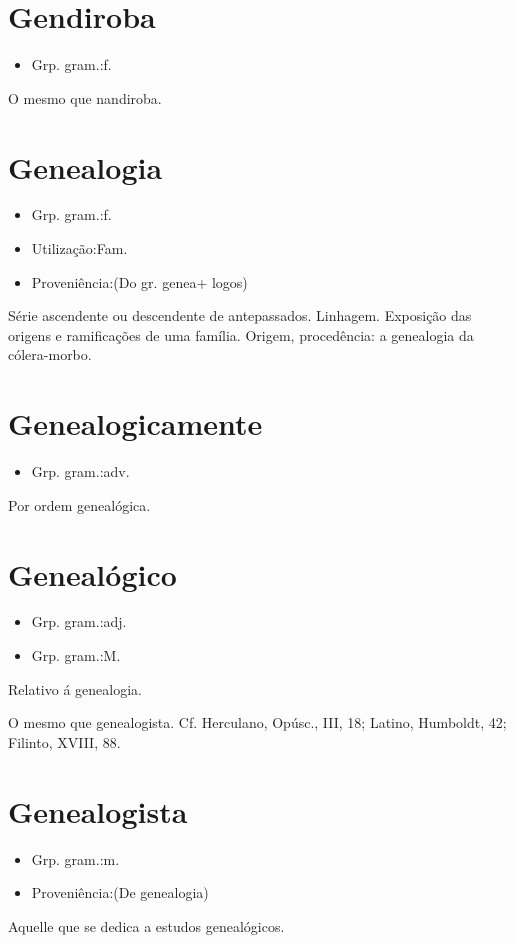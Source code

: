 \section{Gendiroba}
\begin{itemize}
\item {Grp. gram.:f.}
\end{itemize}
O mesmo que \textunderscore nandiroba\textunderscore .
\section{Genealogia}
\begin{itemize}
\item {Grp. gram.:f.}
\end{itemize}
\begin{itemize}
\item {Utilização:Fam.}
\end{itemize}
\begin{itemize}
\item {Proveniência:(Do gr. \textunderscore genea\textunderscore  + \textunderscore logos\textunderscore )}
\end{itemize}
Série ascendente ou descendente de antepassados.
Linhagem.
Exposição das origens e ramificações de uma família.
Origem, procedência: \textunderscore a genealogia da cólera-morbo\textunderscore .
\section{Genealogicamente}
\begin{itemize}
\item {Grp. gram.:adv.}
\end{itemize}
Por ordem genealógica.
\section{Genealógico}
\begin{itemize}
\item {Grp. gram.:adj.}
\end{itemize}
\begin{itemize}
\item {Grp. gram.:M.}
\end{itemize}
Relativo á genealogia.

O mesmo que \textunderscore genealogista\textunderscore . Cf. Herculano, \textunderscore Opúsc.\textunderscore , III, 18; Latino, \textunderscore Humboldt\textunderscore , 42; Filinto, XVIII, 88.
\section{Genealogista}
\begin{itemize}
\item {Grp. gram.:m.}
\end{itemize}
\begin{itemize}
\item {Proveniência:(De \textunderscore genealogia\textunderscore )}
\end{itemize}
Aquelle que se dedica a estudos genealógicos.

